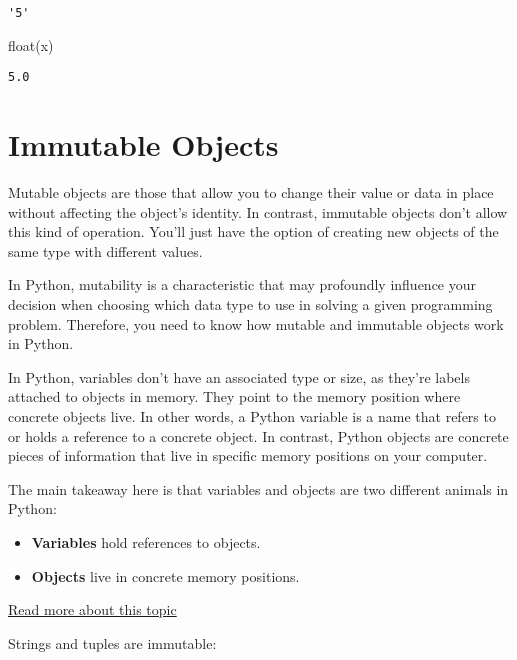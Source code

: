 \documentclass[
  letterpaper,
  DIV=11,
  numbers=noendperiod]{scrreprt}
\newenvironment{Shaded}{\begin{snugshade}}{\end{snugshade}}
\newcommand{\BuiltInTok}[1]{\textcolor[rgb]{0.00,0.23,0.31}{#1}}
\newcommand{\NormalTok}[1]{\textcolor[rgb]{0.00,0.23,0.31}{#1}}
\providecommand{\tightlist}{%
  \setlength{\itemsep}{0pt}\setlength{\parskip}{0pt}}\usepackage{longtable,booktabs,array}
\begin{document}
\begin{verbatim}
'5'
\end{verbatim}

\begin{Shaded}
\begin{Highlighting}[]
\BuiltInTok{float}\NormalTok{(x)}
\end{Highlighting}
\end{Shaded}

\begin{verbatim}
5.0
\end{verbatim}

\hypertarget{immutable-objects}{%
\section{Immutable Objects}\label{immutable-objects}}

Mutable objects are those that allow you to change their value or data
in place without affecting the object's identity. In contrast, immutable
objects don't allow this kind of operation. You'll just have the option
of creating new objects of the same type with different values.

In Python, mutability is a characteristic that may profoundly influence
your decision when choosing which data type to use in solving a given
programming problem. Therefore, you need to know how mutable and
immutable objects work in Python.

In Python, variables don't have an associated type or size, as they're
labels attached to objects in memory. They point to the memory position
where concrete objects live. In other words, a Python variable is a name
that refers to or holds a reference to a concrete object. In contrast,
Python objects are concrete pieces of information that live in specific
memory positions on your computer.

The main takeaway here is that variables and objects are two different
animals in Python:

\begin{itemize}
\tightlist
\item
  \textbf{Variables} hold references to objects.
\item
  \textbf{Objects} live in concrete memory positions.
\end{itemize}

\href{https://realpython.com/python-mutable-vs-immutable-types/}{Read
more about this topic}

Strings and tuples are immutable:
\end{document}
